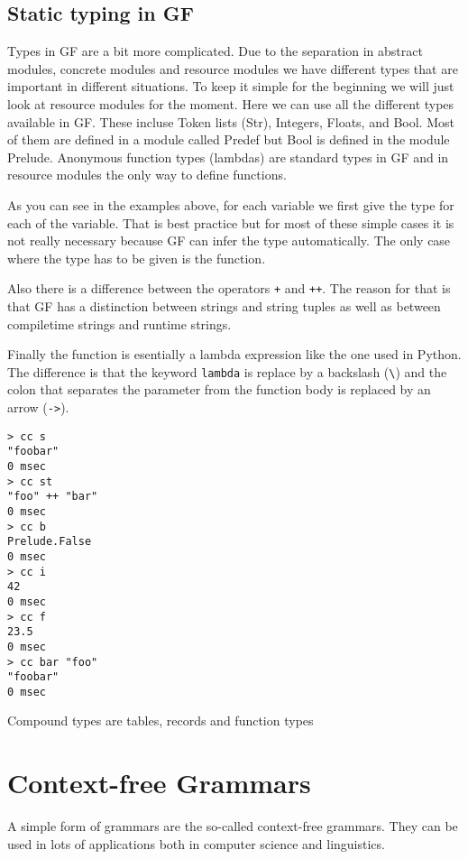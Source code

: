\documentclass{scrartcl}
\begin{document}
\subsection{Static typing in GF}

Types in GF are a bit more complicated. Due to the separation in abstract modules, concrete modules and resource modules we have different types that are important in different situations. To keep it simple for the beginning we will just look at resource modules for the moment. Here we can use all the different types available in GF. These incluse Token lists (Str), Integers, Floats, and Bool. Most of them are defined in a module called Predef but Bool is defined in the module Prelude. Anonymous function types (lambdas) are standard types in GF and in resource modules the only way to define functions.



As you can see in the examples above, for each variable we first give the type for each of the variable. That is best practice but for most of these simple cases it is not really necessary because GF can infer the type automatically. The only case where the type has to be given is the function.

Also there is a difference between the operators \texttt{+} and \texttt{++}. The reason for that is that GF has a distinction between strings and string tuples as well as between compiletime strings and runtime strings.

Finally the function is esentially a lambda expression like the one used in Python. The difference is that the keyword \texttt{lambda} is replace by a backslash (\texttt{\textbackslash}) and the colon that separates the parameter from the function body is replaced by an arrow (\texttt{->}).

\begin{verbatim}
> cc s
"foobar"
0 msec
> cc st
"foo" ++ "bar"
0 msec
> cc b
Prelude.False
0 msec
> cc i
42
0 msec
> cc f
23.5
0 msec
> cc bar "foo"
"foobar"
0 msec
\end{verbatim}

Compound types are tables, records and function types
\section{Context-free Grammars}
A simple form of grammars are the so-called context-free grammars. They can be used in lots of applications both in computer science and linguistics.
\end{document}
